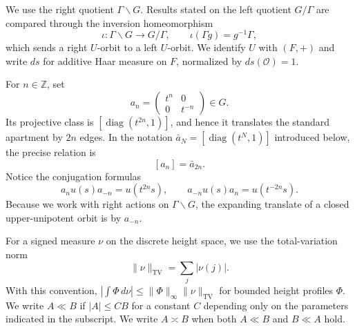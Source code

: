 \documentclass[11pt]{amsart}
\theoremstyle{definition}
\theoremstyle{plain}
\newcommand{\cO}{\mathcal O}
\newcommand{\ZZ}{\mathbb Z}
\newcommand{\TV}{\operatorname{TV}}
\begin{document}
We use the right quotient \(\Gamma\backslash G\).  Results stated on the left
quotient \(G/\Gamma\) are compared through the inversion homeomorphism
\[
\iota:\Gamma\backslash G\longrightarrow G/\Gamma,
\qquad \iota(\Gamma g)=g^{-1}\Gamma,
\]
which sends a right \(U\)-orbit to a left \(U\)-orbit.  We identify \(U\) with
\((F,+)\) and write \(ds\) for additive Haar measure on \(F\), normalized by
\(ds(\cO)=1\).

For \(n\in\ZZ\), set
\[
a_n=\begin{pmatrix}t^n&0\\0&t^{-n}\end{pmatrix}\in G.
\]
Its projective class is \([\operatorname{diag}(t^{2n},1)]\), and hence it
translates the standard apartment by \(2n\) edges.  In the notation
\(\bar a_N=[\operatorname{diag}(t^N,1)]\) introduced below, the precise
relation is
\[
[a_n]=\bar a_{2n}.
\]
Notice the conjugation formulas
\[
a_nu(s)a_{-n}=u(t^{2n}s),
\qquad
a_{-n}u(s)a_n=u(t^{-2n}s).
\]
Because we work with right actions on \(\Gamma\backslash G\), the expanding
translate of a closed upper-unipotent orbit is by \(a_{-n}\).

For a signed measure \(\nu\) on the discrete height space, we use the total-variation norm
\[
\|\nu\|_{\TV}=\sum_j |\nu(j)|.
\]
With this convention,
\(|\int \Phi\,d\nu|\le \|\Phi\|_\infty\|\nu\|_{\TV}\) for bounded height
profiles \(\Phi\).
We write \(A\ll B\) if \(|A|\le C B\) for a constant \(C\) depending only on the
parameters indicated in the subscript.
We write \(A\asymp B\) when both \(A\ll B\) and \(B\ll A\) hold.
\end{document}
